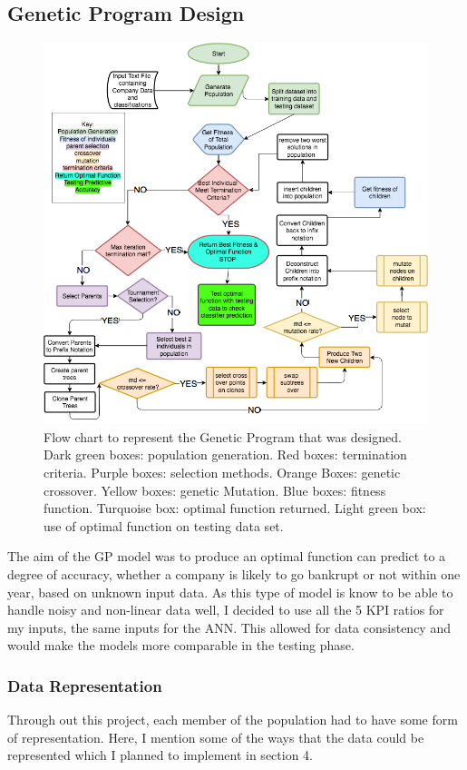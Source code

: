 \documentclass[11pt]{article}
\begin{document}
\subsection{Genetic Program Design}
\begin{figure}[h]
\centering
\includegraphics[scale = .55]{GPFlowReformat} 
\caption{Flow chart to represent the Genetic Program that was designed. Dark green boxes: population generation. Red boxes: termination criteria. Purple boxes: selection methods. Orange Boxes: genetic crossover. Yellow boxes: genetic Mutation. Blue boxes: fitness function. Turquoise box: optimal function returned. Light green box: use of optimal function on testing data set.} 
\end{figure}
The aim of the GP model was to produce an optimal function can predict to a degree of accuracy, whether a company is likely to go bankrupt or not within one year, based on unknown input data. As this type of model is know to be able to handle noisy and non-linear data well, I decided to use all the 5 KPI ratios for my inputs, the same inputs for the ANN. This allowed for data consistency and would make the models more comparable in the testing phase.
\subsubsection{Data Representation}
Through out this project, each member of the population had to have some form of representation. Here, I mention some of the ways that the data could be represented which I planned to implement in section 4. 
\end{document}
